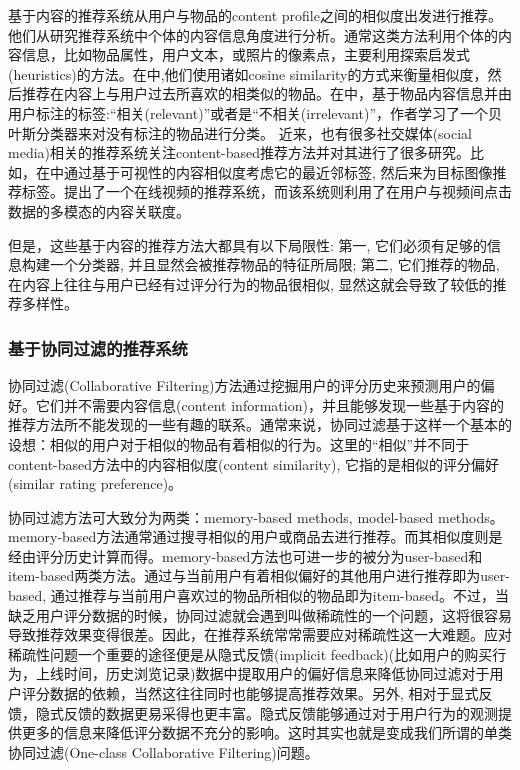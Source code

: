 基于内容的推荐系统从用户与物品的content profile之间的相似度出发进行推荐。他们从研究推荐系统中个体的内容信息角度进行分析。通常这类方法利用个体的内容信息，比如物品属性，用户文本，或照片的像素点，主要利用探索启发式(heuristics)的方法。在\cite{balabanovic1997fab,lang1995newsweeder,mooney2000content}中,他们使用诸如cosine similarity的方式来衡量相似度，然后推荐在内容上与用户过去所喜欢的相类似的物品。在\cite{pazzani1997learning}中，基于物品内容信息并由用户标注的标签:“相关(relevant)”或者是“不相关(irrelevant)”，作者学习了一个贝叶斯分类器来对没有标注的物品进行分类。 近来，也有很多社交媒体(social media)相关的推荐系统关注content-based推荐方法并对其进行了很多研究。比如，在\cite{li2009learning,liu2009tag}中通过基于可视性的内容相似度考虑它的最近邻标签, 然后来为目标图像推荐标签。\cite{mei2007videoreach}提出了一个在线视频的推荐系统，而该系统则利用了在用户与视频间点击数据的多模态的内容关联度。

但是，这些基于内容的推荐方法大都具有以下局限性: 第一, 它们必须有足够的信息构建一个分类器, 并且显然会被推荐物品的特征所局限; 第二, 它们推荐的物品, 在内容上往往与用户已经有过评分行为的物品很相似, 显然这就会导致了较低的推荐多样性。


\subsubsection{基于协同过滤的推荐系统}
协同过滤(Collaborative Filtering)方法通过挖掘用户的评分历史来预测用户的偏好。它们并不需要内容信息(content information)，并且能够发现一些基于内容的推荐方法所不能发现的一些有趣的联系。通常来说，协同过滤基于这样一个基本的设想：相似的用户对于相似的物品有着相似的行为\cite{adomavicius2005toward,su2009survey}。这里的“相似”并不同于content-based方法中的内容相似度(content similarity), 它指的是相似的评分偏好(similar rating preference)。

协同过滤方法可大致分为两类：memory-based methods, model-based methods。memory-based方法\cite{breese1998empirical,herlocker1999algorithmic,linden2003amazon,sarwar2001item}通常通过搜寻相似的用户或商品去进行推荐。而其相似度则是经由评分历史计算而得。memory-based方法也可进一步的被分为user-based和item-based两类方法。通过与当前用户有着相似偏好的其他用户进行推荐即为user-based, 通过推荐与当前用户喜欢过的物品所相似的物品即为item-based。不过，当缺乏用户评分数据的时候，协同过滤就会遇到叫做稀疏性的一个问题，这将很容易导致推荐效果变得很差。因此，在推荐系统常常需要应对稀疏性这一大难题。应对稀疏性问题一个重要的途径便是从隐式反馈(implicit feedback)(比如用户的购买行为，上线时间，历史浏览记录)数据中提取用户的偏好信息来降低协同过滤对于用户评分数据的依赖，当然这往往同时也能够提高推荐效果\cite{DBLP:conf/icdm/HuKV08,DBLP:journals/eswa/AlbadviS09}。另外, 相对于显式反馈，隐式反馈的数据更易采得也更丰富。隐式反馈能够通过对于用户行为的观测提供更多的信息来降低评分数据不充分的影响\cite{rafeh2012adaptive,DBLP:journals/eswa/ZhengL11}。这时其实也就是变成我们所谓的单类协同过滤(One-class Collaborative Filtering)问题。

